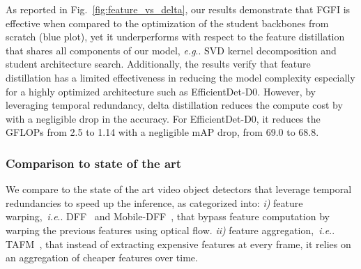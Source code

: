 \documentclass[runningheads]{llncs}
\makeatletter
\DeclareRobustCommand\onedot{\futurelet\@let@token\@onedot}
\def\@onedot{\ifx\@let@token.\else.\null\fi\xspace}
\def\eg{\emph{e.g}\onedot} \def\Eg{\emph{E.g}\onedot}
\def\ie{\emph{i.e}\onedot} \def\Ie{\emph{I.e}\onedot}
\makeatother
\begin{document}
As reported in Fig.~\ref{fig:feature_vs_delta}, our results demonstrate that FGFI is effective when compared to the optimization of the student backbones from scratch (blue plot), yet it underperforms with respect to the feature distillation that shares all components of our model, \eg SVD kernel decomposition and student architecture search. Additionally, the results verify that feature distillation has a limited effectiveness in reducing the model complexity especially for a highly optimized architecture such as EfficientDet-D0. However, by leveraging temporal redundancy, delta distillation reduces the compute cost by  with a negligible drop in the accuracy. For EfficientDet-D0, it reduces the GFLOPs from 2.5 to 1.14 with a negligible mAP drop, from 69.0 to 68.8.
\subsubsection{Comparison to state of the art}
We compare to the state of the art video object detectors that leverage temporal redundancies to speed up the inference, as categorized into: \emph{i)} feature warping,~\ie DFF~\cite{zhu17dff} and Mobile-DFF~\cite{flow_guided}, that bypass feature computation by warping the previous features using optical flow.
\emph{ii)} feature aggregation,~\ie TAFM~\cite{liu2018mobile}, that instead of extracting expensive features at every frame, it relies on an aggregation of cheaper features over time.
\renewcommand{\arraystretch}{1.1}
\end{document}
